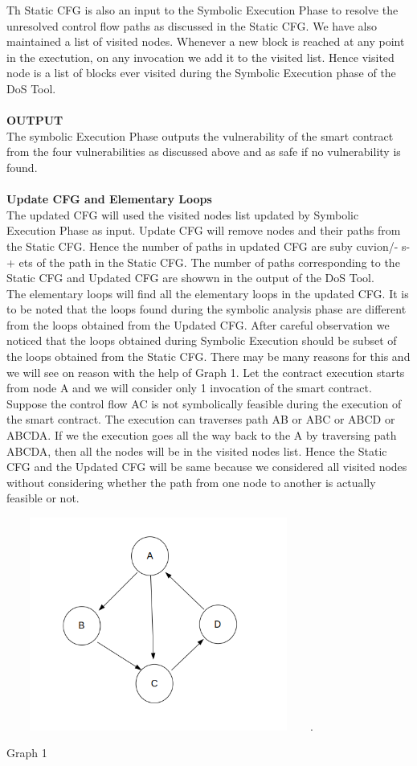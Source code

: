 \documentclass{article}
\begin{document}
Th Static CFG is also an input to the Symbolic Execution Phase to resolve the unresolved control flow paths as discussed in the Static CFG. We have also maintained a list of visited nodes. Whenever a new block is reached at any point in the exectution, on any invocation we add it to the visited list. Hence visited node is a list of blocks ever visited during the Symbolic Execution phase of the DoS Tool.\\
\\
\textbf{OUTPUT}\\
The symbolic Execution Phase outputs the vulnerability of the smart contract from the four vulnerabilities as discussed above and as safe if no vulnerability is found.\\
\\
\textbf{Update CFG and Elementary Loops}\\
The updated CFG will used the visited nodes list updated by Symbolic Execution Phase as input. Update CFG will remove nodes and their paths from the Static CFG. Hence the number of paths in updated CFG are suby cuvion/-
s-+
ets of the path in the Static CFG. The number of paths corresponding to the Static CFG and Updated CFG are showwn in the output of the DoS Tool.\\
The elementary loops will find all the elementary loops in the updated CFG. It is to be noted that the loops found during the symbolic analysis phase are different from the loops obtained from the Updated CFG. After careful observation we noticed that the loops obtained during Symbolic Execution should be subset of the loops obtained from the Static CFG. There may be many reasons for this and we will see on reason with the help of Graph 1. Let the contract execution starts from node A and we will consider only 1 invocation of the smart contract. Suppose the control flow AC is not symbolically feasible during the execution of the smart contract. The execution can traverses path AB or ABC or ABCD or ABCDA. If we the execution goes all the way back to the A by traversing path ABCDA, then all the nodes will be in the visited nodes list. Hence the Static CFG and the Updated CFG will be same because we considered all visited nodes without considering whether the path from one node to another is actually feasible or not.\\
\begin{center}
\includegraphics[width=10cm, height=7cm]{images/4.png}.

    Graph 1
\end{center}
\end{document}

